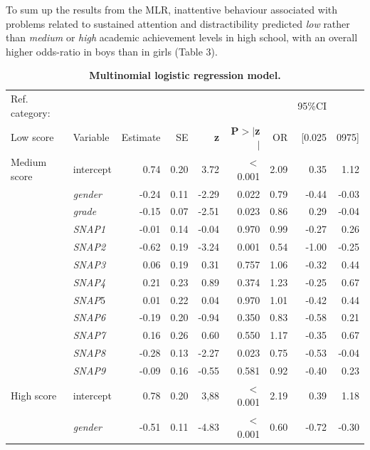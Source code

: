 \documentclass[10pt,letterpaper]{article}
\begin{document}
{{To sum up the results from the MLR, inattentive behaviour associated with problems related to sustained attention and distractibility predicted {\it low} rather than {\it medium}
or {\it high} academic achievement levels in high school, with an overall higher odds-ratio in boys than in girls (Table 3). \\


\vspace{3mm}

\begin{table}[H]
\centering
\caption{\bf Multinomial logistic regression model.} 
\begin{tabular}{|llrrrr|rrr|}
  \hline
Ref. category: &&&&&&&95\%CI&\\
Low score & Variable &Estimate & SE & \textbf{z} & \textbf{P$>$$|$z$|$} &  OR &  [0.025 & 0975]\\ 
 \hline
  \hline
Medium score & intercept  & 0.74 & 0.20 & 3.72 & $<$0.001 & 2.09 &   0.35 & 1.12 \\ 
\hline
  & {\it gender} & -0.24 & 0.11 & -2.29 & 0.022 & 0.79 &  -0.44 & -0.03  \\ 
 \hline
  & {\it grade} & -0.15 & 0.07 & -2.51 & 0.023& 0.86 &  0.29 & -0.04  \\ 
 \hline
  & {\it SNAP1} & -0.01 & 0.14 & -0.04 & 0.970 & 0.99 &  -0.27 & 0.26 \\ 
  \hline
  &  {\it SNAP2} & -0.62 & 0.19 & -3.24 & 0.001 & 0.54 &  -1.00 & -0.25  \\ 
  \hline
  &  {\it SNAP3} & 0.06 & 0.19 & 0.31 & 0.757& 1.06 &  -0.32 & 0.44 \\ 
  \hline
  & {\it SNAP4} & 0.21 & 0.23 & 0.89 & 0.374 & 1.23 &  -0.25 & 0.67  \\ 
  \hline
  &  {\it SNAP}5 & 0.01 & 0.22 & 0.04 & 0.970 & 1.01 & -0.42 & 0.44 \\ 
  \hline
  &  {\it SNAP6} & -0.19 & 0.20 & -0.94 & 0.350 &  0.83 &  -0.58 & 0.21  \\ 
   \hline
  &  {\it SNAP7} & 0.16 & 0.26 & 0.60 & 0.550 & 1.17 &  -0.35 & 0.67  \\ 
  \hline
  &  {\it SNAP8} & -0.28 & 0.13 & -2.27 & 0.023 & 0.75 &  -0.53 & -0.04  \\ 
  \hline
  &  {\it SNAP9} & -0.09 & 0.16 & -0.55 & 0.581 & 0.92 &  -0.40 & 0.23  \\ 
   \hline
   \hline
   High score & intercept & 0.78 & 0.20 & 3,88 & $<$0.001 & 2.19 &  0.39 & 1.18  \\ 
  \hline
  &  {\it gender} & -0.51 & 0.11 & -4.83 & $<$0.001 & 0.60 &  -0.72 & -0.30  \\ 

\end{tabular}
\end{table}}}
\end{document}
